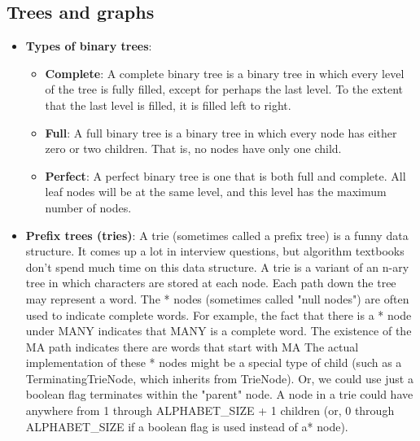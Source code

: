\documentclass{report}
\begin{document}
    \subsection{Trees and graphs}
    \begin{itemize}
        \item \textbf{Types of binary trees}:  
            \begin{itemize}
                \item \textbf{Complete}: A complete binary tree is a binary tree in which every level of the tree is fully filled, except for perhaps the last level. To the extent that the last level is filled, it is filled left to right.
                    \bigbreak \noindent 
                \item \textbf{Full}: A full binary tree is a binary tree in which every node has either zero or two children. That is, no nodes have only one child.
                    \bigbreak \noindent 
                \item \textbf{Perfect}: A perfect binary tree is one that is both full and complete. All leaf nodes will be at the same level, and this level has the maximum number of nodes.
            \end{itemize}
        \item \textbf{Prefix trees (tries)}:  A trie (sometimes called a prefix tree) is a funny data structure. It comes up a lot in interview questions, but algorithm textbooks don't spend much time on this data structure.
            \bigbreak \noindent 
            A trie is a variant of an n-ary tree in which characters are stored at each node. Each path down the tree may represent a word.
            \bigbreak \noindent 
            The * nodes (sometimes called "null nodes") are often used to indicate complete words. For example, the fact that there is a * node under MANY indicates that MANY is a complete word. The existence of the MA path indicates there are words that start with MA
            \bigbreak \noindent 
            The actual implementation of these * nodes might be a special type of child (such as a TerminatingTrieNode, which inherits from TrieNode). Or, we could use just a boolean flag terminates within the "parent" node.
            \bigbreak \noindent 
            A node in a trie could have anywhere from 1 through ALPHABET\_SIZE + 1 children (or, 0 through ALPHABET\_SIZE if a boolean flag is used instead of a* node).

\end{itemize}
\end{document}
